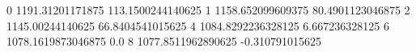 0 1191.31201171875 113.1500244140625
1 1158.652099609375 80.4901123046875
2 1145.00244140625 66.8404541015625
4 1084.8292236328125 6.667236328125
6 1078.1619873046875 0.0
8 1077.8511962890625 -0.310791015625
